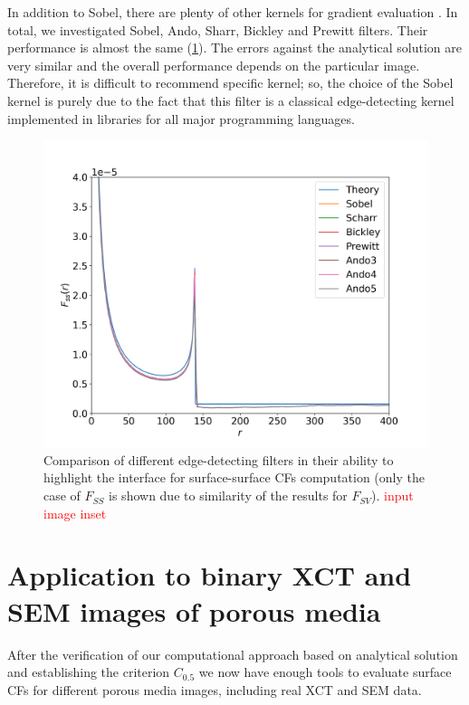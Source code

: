 \documentclass[reprint,amsmath,amssymb,aps,pre,showkeys,showpacs]{revtex4-1}
\begin{document}
In addition to Sobel, there are plenty of other kernels for gradient evaluation
\cite{bickley1948,prewitt1970,ando2000}. In total, we investigated Sobel, Ando,
Sharr, Bickley and Prewitt filters. Their performance is almost the same
(\cref{fig:kernels}). The errors against the analytical solution are very
similar and the overall performance depends on the particular image. Therefore,
it is difficult to recommend specific kernel; so, the choice of the Sobel kernel
is purely due to the fact that this filter is a classical edge-detecting kernel
implemented in libraries for all major programming languages.

\begin{figure}[ht]
  \centering \includegraphics[width=\linewidth]{images/kernels.png}
  \caption{Comparison of different edge-detecting filters in their ability to
    highlight the interface for surface-surface CFs computation (only the case
    of $F_{SS}$ is shown due to similarity of the results for
    $F_{SV}$). \textcolor{red}{input image inset}}
  \label{fig:kernels}
\end{figure}

\section{Application to binary XCT and SEM images of porous media}
\label{sec:application}
After the verification of our computational approach based on analytical
solution and establishing the criterion $C_{0.5}$ we now have enough tools to
evaluate surface CFs for different porous media images, including real XCT and
SEM data.
\end{document}
